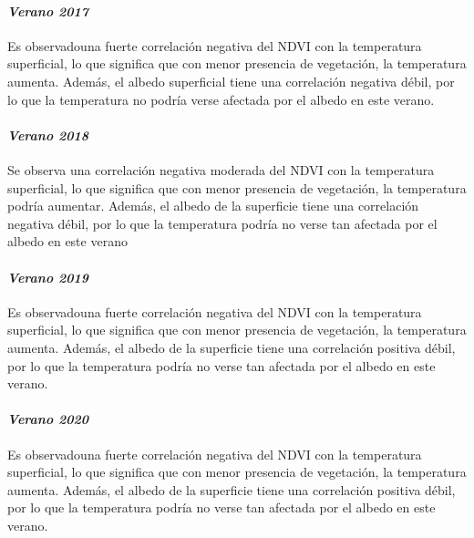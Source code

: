 \documentclass[
]{article}
\begin{document}
\hypertarget{verano-2017}{%
\paragraph{\texorpdfstring{\emph{Verano
2017}}{Verano 2017}}\label{verano-2017}}

Es observadouna fuerte correlación negativa del NDVI con la temperatura
superficial, lo que significa que con menor presencia de vegetación, la
temperatura aumenta. Además, el albedo superficial tiene una correlación
negativa débil, por lo que la temperatura no podría verse afectada por
el albedo en este verano.

\hypertarget{verano-2018}{%
\paragraph{\texorpdfstring{\emph{Verano
2018}}{Verano 2018}}\label{verano-2018}}

Se observa una correlación negativa moderada del NDVI con la temperatura
superficial, lo que significa que con menor presencia de vegetación, la
temperatura podría aumentar. Además, el albedo de la superficie tiene
una correlación negativa débil, por lo que la temperatura podría no
verse tan afectada por el albedo en este verano

\hypertarget{verano-2019}{%
\paragraph{\texorpdfstring{\emph{Verano
2019}}{Verano 2019}}\label{verano-2019}}

Es observadouna fuerte correlación negativa del NDVI con la temperatura
superficial, lo que significa que con menor presencia de vegetación, la
temperatura aumenta. Además, el albedo de la superficie tiene una
correlación positiva débil, por lo que la temperatura podría no verse
tan afectada por el albedo en este verano.

\hypertarget{verano-2020}{%
\paragraph{\texorpdfstring{\emph{Verano
2020}}{Verano 2020}}\label{verano-2020}}

Es observadouna fuerte correlación negativa del NDVI con la temperatura
superficial, lo que significa que con menor presencia de vegetación, la
temperatura aumenta. Además, el albedo de la superficie tiene una
correlación positiva débil, por lo que la temperatura podría no verse
tan afectada por el albedo en este verano.
\end{document}
